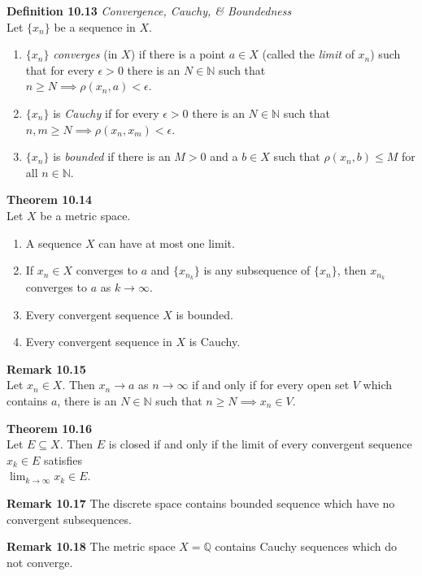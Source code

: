 \documentclass[8pt,landscape]{article}
\begin{document}
\begin{multicols}{3}
\textbf{Definition 10.13} \emph{Convergence, Cauchy, \& Boundedness} \\
Let $\{x_n\}$ be a sequence in $X$.
\begin{enumerate}
    \item $\{x_n\}$ \emph{converges} (in $X$) if there is a point $a \in X$
        (called the \emph{limit} of $x_n$) such that for every $\epsilon > 0$
        there is an $N \in \mathbb{N}$ such that \\
        $n \geq N \implies \rho(x_n, a) < \epsilon$.
    \item $\{x_n\}$ is \emph{Cauchy} if for every $\epsilon > 0$ there is an
        $N \in \mathbb{N}$ such that \\
        $n, m \geq N \implies \rho(x_n, x_m) < \epsilon$.
    \item $\{x_n\}$ is \emph{bounded} if there is an $M > 0$ and a $b \in X$ such that
        $\rho (x_n, b) \leq M$ for all $n \in \mathbb{N}$.
\end{enumerate}

\textbf{Theorem 10.14} \\
Let $X$ be a metric space.
\begin{enumerate}
    \item A sequence $X$ can have at most one limit.
    \item If $x_n \in X$ converges to $a$ and $\{x_{n_k}\}$ is any subsequence of
        $\{x_n\}$, then $x_{n_k}$ converges to $a$ as $k \to \infty$.
    \item Every convergent sequence $X$ is bounded.
    \item Every convergent sequence in $X$ is Cauchy.
\end{enumerate}

\textbf{Remark 10.15} \\
Let $x_n \in X$.
Then $x_n \to a$ as $n \to \infty$ if and only if for every open set $V$ which
contains $a$, there is an $N \in \mathbb{N}$ such that $n \geq N \implies x_n \in V$.

\textbf{Theorem 10.16} \\
Let $E \subseteq X$.
Then $E$ is closed if and only if the limit of every convergent sequence $x_k \in E$
satisfies \\
$\lim_{k \to \infty} x_k \in E$.

\textbf{Remark 10.17}
The discrete space contains bounded sequence which have no convergent subsequences.

\textbf{Remark 10.18}
The metric space $X = \mathbb{Q}$ contains Cauchy sequences which do not converge.


\end{multicols}
\end{document}
